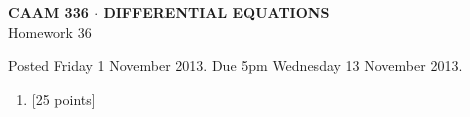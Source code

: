 \documentclass[10pt]{article}
\begin{document}
\vspace*{-5em}
\begin{center}
\large \textsf{\textbf{CAAM 336 $\cdot$ DIFFERENTIAL EQUATIONS}\\[0.5em]
Homework 36 }
\end{center}

Posted Friday 1 November 2013.  Due 5pm Wednesday 13 November 2013.

\begin{enumerate}\addtocounter{enumi}{35}
\item {[25 points]}  
\end{enumerate}
\end{document}

